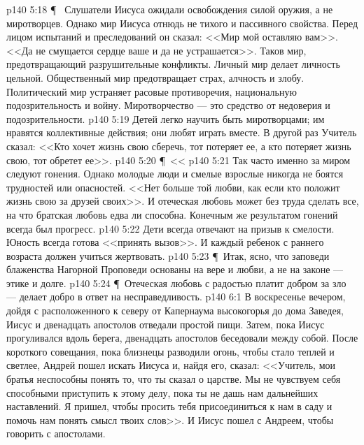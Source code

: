 \vs p140 5:18 \P\ \bibnobreakspace {} Слушатели Иисуса ожидали освобождения силой оружия, а не миротворцев. Однако мир Иисуса отнюдь не тихого и пассивного свойства. Перед лицом испытаний и преследований он сказал: <<Мир мой оставляю вам>>. <<Да не смущается сердце ваше и да не устрашается>>. Таков мир, предотвращающий разрушительные конфликты. Личный мир делает личность цельной. Общественный мир предотвращает страх, алчность и злобу. Политический мир устраняет расовые противоречия, национальную подозрительность и войну. Миротворчество --- это средство от недоверия и подозрительности.
\vs p140 5:19 Детей легко научить быть миротворцами; им нравятся коллективные действия; они любят играть вместе. В другой раз Учитель сказал: <<Кто хочет жизнь свою сберечь, тот потеряет ее, а кто потеряет жизнь свою, тот обретет ее>>.
\vs p140 5:20 \P\ \bibnobreakspace <<
\vs p140 5:21 Так часто именно за миром следуют гонения. Однако молодые люди и смелые взрослые никогда не боятся трудностей или опасностей. <<Нет больше той любви, как если кто положит жизнь свою за друзей своих>>. И отеческая любовь может без труда сделать все, на что братская любовь едва ли способна. Конечным же результатом гонений всегда был прогресс.
\vs p140 5:22 Дети всегда отвечают на призыв к смелости. Юность всегда готова <<принять вызов>>. И каждый ребенок с раннего возраста должен учиться жертвовать.
\vs p140 5:23 \P\ Итак, ясно, что заповеди блаженства Нагорной Проповеди основаны на вере и любви, а не на законе --- этике и долге.
\vs p140 5:24 \P\ Отеческая любовь с радостью платит добром за зло --- делает добро в ответ на несправедливость.
\vs p140 6:1 В воскресенье вечером, дойдя с расположенного к северу от Капернаума высокогорья до дома Заведея, Иисус и двенадцать апостолов отведали простой пищи. Затем, пока Иисус прогуливался вдоль берега, двенадцать апостолов беседовали между собой. После короткого совещания, пока близнецы разводили огонь, чтобы стало теплей и светлее, Андрей пошел искать Иисуса и, найдя его, сказал: <<Учитель, мои братья неспособны понять то, что ты сказал о царстве. Мы не чувствуем себя способными приступить к этому делу, пока ты не дашь нам дальнейших наставлений. Я пришел, чтобы просить тебя присоединиться к нам в саду и помочь нам понять смысл твоих слов>>. И Иисус пошел с Андреем, чтобы говорить с апостолами.
